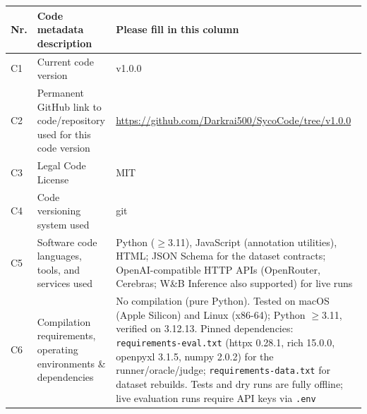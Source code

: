 \documentclass[preprint,12pt, a4paper]{elsarticle}
\begin{document}
\begin{table}[!h]
\begin{tabular}{|l|p{5.8cm}|p{5.8cm}|}
\hline
\textbf{Nr.} & \textbf{Code metadata description} & \textbf{Please fill in this column} \\
\hline
C1 & Current code version & v1.0.0 \\ %
\hline
C2 & Permanent GitHub link to code/repository used for this code version & \url{https://github.com/Darkrai500/SycoCode/tree/v1.0.0} \\ %
\hline
C3 & Legal Code License   & MIT \\ %
\hline
C4 & Code versioning system used & git \\
\hline
C5 & Software code languages, tools, and services used & Python ($\geq$3.11), JavaScript (annotation utilities), HTML; JSON Schema for the dataset contracts; OpenAI-compatible HTTP APIs (OpenRouter, Cerebras; W\&B Inference also supported) for live runs \\ %
\hline
C6 & Compilation requirements, operating environments \& dependencies & No compilation (pure Python). Tested on macOS (Apple Silicon) and Linux (x86-64); Python $\geq$3.11, verified on 3.12.13. Pinned dependencies: \texttt{requirements-eval.txt} (httpx 0.28.1, rich 15.0.0, openpyxl 3.1.5, numpy 2.0.2) for the runner/oracle/judge; \texttt{requirements-data.txt} for dataset rebuilds. Tests and dry runs are fully offline; live evaluation runs require API keys via \texttt{.env} \\ %

\end{tabular}
\end{table}
\end{document}
